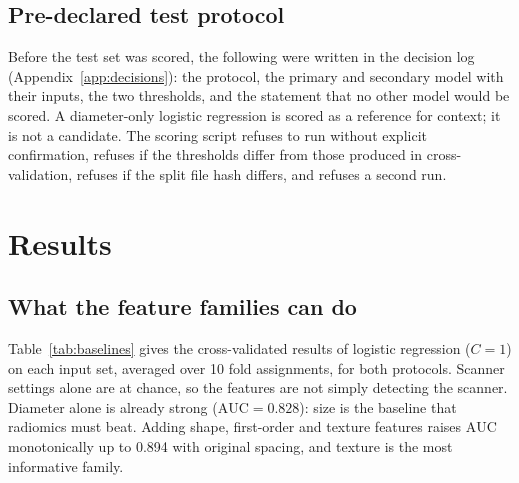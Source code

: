 \documentclass[journal]{IEEEtran}
\newcommand{\auc}{\mathrm{AUC}}
\begin{document}
\subsection{Pre-declared test protocol}
Before the test set was scored, the following were written in the decision log (Appendix~\ref{app:decisions}):
the protocol, the primary and secondary model with their inputs, the two thresholds, and the statement that
no other model would be scored. A diameter-only logistic regression is scored as a reference for context; it
is not a candidate. The scoring script refuses to run without explicit confirmation, refuses if the thresholds
differ from those produced in cross-validation, refuses if the split file hash differs, and refuses a second run.

\section{Results}
\label{sec:results}

\subsection{What the feature families can do}
\label{sec:baselines}
Table~\ref{tab:baselines} gives the cross-validated results of logistic regression ($C=1$) on each input set,
averaged over 10 fold assignments, for both protocols. Scanner settings alone are at chance, so the features
are not simply detecting the scanner. Diameter alone is already strong ($\auc=0.828$): size is the baseline that
radiomics must beat. Adding shape, first-order and texture features raises $\auc$ monotonically up to 0.894 with
original spacing, and texture is the most informative family.
\end{document}
